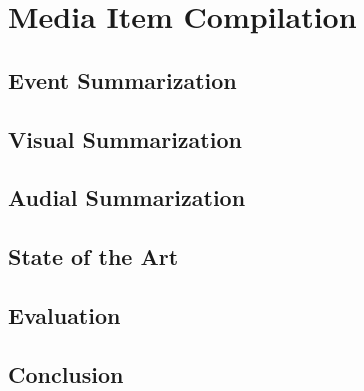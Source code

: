 

\chapter{Media Item Compilation}

\ifpdf
    \graphicspath{{8_media_item_compilation/figures/PNG/}{8_media_item_compilation/figures/PDF/}{8_media_item_compilation/figures/}}
\else
    \graphicspath{{8_media_item_compilation/figures/EPS/}{8_media_item_compilation/figures/}}
\fi


\section{Event Summarization}

\section{Visual Summarization}

\section{Audial Summarization}

\section{State of the Art}

\section{Evaluation}

\section{Conclusion}